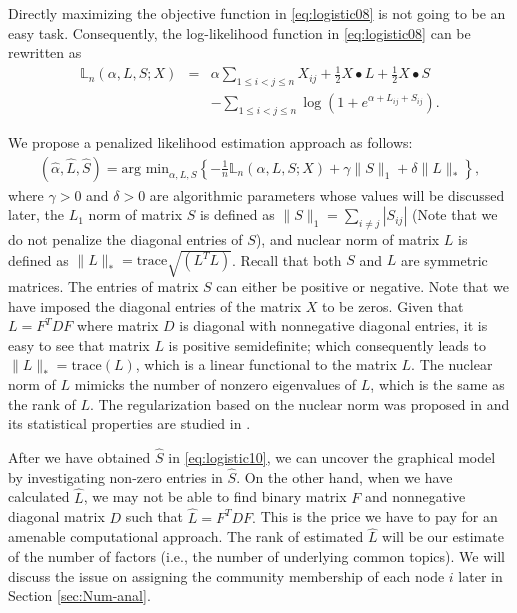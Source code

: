 \documentclass[AMS,STIX1COL]{WileyNJD-v2}
\begin{document}
{\begin{enumerate}
\end{enumerate}


Directly maximizing the objective function in \eqref{eq:logistic08} is not going to be an easy task.
Consequently, the log-likelihood function in \eqref{eq:logistic08} can be rewritten as
\begin{eqnarray}
\label{eq:logistic09}
\mathbb{L}_n(\alpha,  L, S; X)
&=& \alpha \sum_{1\le i< j\le n}X_{ij} +\frac{1}{2} X \bullet L +\frac{1}{2} X \bullet S \\
&& -\sum_{1\le i<j\le n} \log \left(1 + e^{\alpha + L_{ij} +S_{ij}}\right). \nonumber
\end{eqnarray}


We propose a penalized likelihood estimation approach as follows:
\begin{eqnarray}
\label{eq:logistic10}
(\hat{\alpha}, \widehat{L}, \widehat{S})
= \mbox{arg min}_{\alpha, L, S} \left\{
-\frac{1}{n} \mathbb{L}_n(\alpha,  L, S; X) + \gamma \|S\|_1
+ \delta \|L\|_\ast\right\},
\end{eqnarray}
where $\gamma>0$ and $\delta>0$ are algorithmic parameters whose values will be discussed later,
the $L_1$ norm of matrix $S$ is defined as $\|S\|_1 = \sum_{i\neq j} |S_{ij}|$ (Note that we do not penalize the diagonal entries of $S$), and nuclear norm of matrix $L$ is defined as $\|L\|_\ast = {\mbox{trace}\sqrt{(L^T L)}}$.
Recall that both $S$ and $L$ are symmetric matrices.
The entries of matrix $S$ can either be positive or negative.
Note that we have imposed the diagonal entries of the matrix $X$ to be zeros.
Given that $L = F^T D F$ where matrix $D$ is diagonal with nonnegative diagonal entries, it is easy to see that matrix $L$ is positive semidefinite; which consequently leads to $\|L\|_\ast = \mbox{trace}(L)$, which is a linear functional to the matrix $L$.
The nuclear norm of $L$ mimicks the number of nonzero eigenvalues of $L$, which is the same as the rank
of $L$.
The regularization based on the nuclear norm was proposed in \cite{fazel2001rank}
and its statistical properties are studied in \cite{bach2008consistency}.

After we have obtained $\widehat{S}$ in \eqref{eq:logistic10}, we can uncover the graphical model by investigating non-zero entries in $\widehat{S}$.
On the other hand, when we have calculated $\widehat{L}$, we may not be able to find binary matrix $F$ and nonnegative diagonal matrix $D$ such that $\widehat{L} = F^T D F.$
This is the price we have to pay for an amenable computational approach.
The rank of estimated $\widehat{L}$ will be our estimate of the number of factors (i.e., the number of underlying common topics).
We will discuss the issue on assigning the community membership of each node $i$ later in Section \ref{sec:Num-anal}.

}
\end{document}

